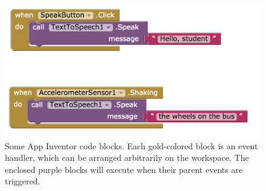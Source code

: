 \begin{figure}
  \centering
      \includegraphics[width=\textwidth]{images/debugActivity/debug0start}
  \caption[Some App Inventor code blocks]{Some App Inventor code blocks. Each gold-colored block is an event handler, which can be arranged arbitrarily on the workspace. The enclosed purple blocks will execute when their parent events are triggered.}
  \label{fig:debug0ch2}
\end{figure}





